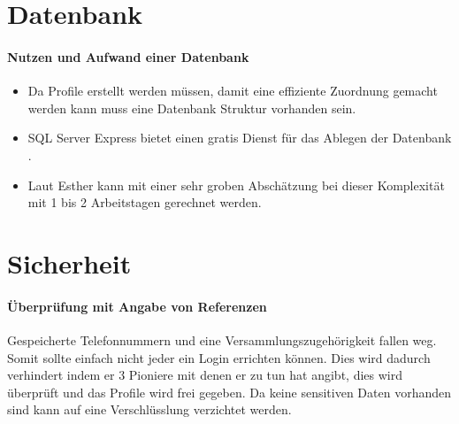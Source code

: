 \section{Datenbank}
\paragraph{Nutzen und Aufwand einer Datenbank}\begin{itemize}
\item Da Profile erstellt werden müssen, damit eine effiziente Zuordnung gemacht werden kann muss eine Datenbank Struktur vorhanden sein.
\item SQL Server Express bietet einen gratis Dienst für das Ablegen der Datenbank \cite{SQL}.
\item Laut Esther kann mit einer sehr groben Abschätzung bei dieser Komplexität mit 1 bis 2 Arbeitstagen gerechnet werden.
\end{itemize}

\section{Sicherheit}
\paragraph{Überprüfung mit Angabe von Referenzen} Gespeicherte Telefonnummern und eine Versammlungszugehörigkeit fallen weg. Somit sollte einfach nicht jeder ein Login errichten können. Dies wird dadurch verhindert indem er 3 Pioniere mit denen er zu tun hat angibt, dies wird überprüft und das Profile wird frei gegeben. Da keine sensitiven Daten vorhanden sind kann auf eine Verschlüsslung verzichtet werden.